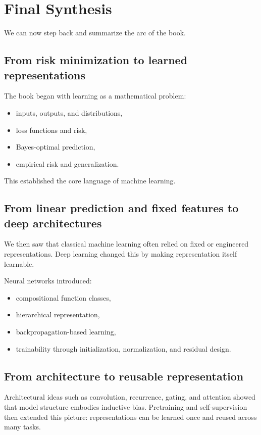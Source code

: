 \section{Final Synthesis}

We can now step back and summarize the arc of the book.

\subsection*{From risk minimization to learned representations}

The book began with learning as a mathematical problem:
\begin{itemize}
    \item inputs, outputs, and distributions,
    \item loss functions and risk,
    \item Bayes-optimal prediction,
    \item empirical risk and generalization.
\end{itemize}

This established the core language of machine learning.

\subsection*{From linear prediction and fixed features to deep architectures}

We then saw that classical machine learning often relied on fixed or engineered representations.
Deep learning changed this by making representation itself learnable.

\medskip

Neural networks introduced:
\begin{itemize}
    \item compositional function classes,
    \item hierarchical representation,
    \item backpropagation-based learning,
    \item trainability through initialization, normalization, and residual design.
\end{itemize}

\subsection*{From architecture to reusable representation}

Architectural ideas such as convolution, recurrence, gating, and attention showed that model structure embodies inductive bias.
Pretraining and self-supervision then extended this picture:
representations can be learned once and reused across many tasks.


